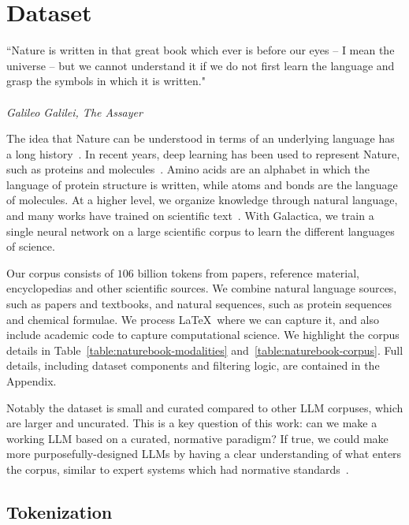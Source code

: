 \section{Dataset}

\begin{displayquote}
“Nature is written in that great book which ever is before our eyes -- I mean the universe -- but we cannot understand it if we do not first learn the language and grasp the symbols in which it is written." \\ \\
\textit{Galileo Galilei, The Assayer}
\end{displayquote}

The idea that Nature can be understood in terms of an underlying language has a long history~\citep{Assayer, Wigner, Wheeler}. In recent years, deep learning has  been used to represent Nature, such as proteins and molecules~\citep{AlphaFold2021, MoLformer}. Amino acids are an alphabet in which the language of protein structure is written, while atoms and bonds are the language of molecules. At a higher level, we organize knowledge through natural language, and many works have trained on scientific text~\citep{SciBERT, BioLM, PubMedBERT, S2ORCBERT}. With Galactica, we train a single neural network on a large scientific corpus to learn the different languages of science.

Our corpus consists of \(106\) billion tokens from papers, reference material, encyclopedias and other scientific sources. We combine natural language sources, such as papers and textbooks, and natural sequences, such as protein sequences and chemical formulae. We process \LaTeX\  where we can capture it, and also include academic code to capture computational science. We highlight the corpus details in Table~\ref{table:naturebook-modalities} and~\ref{table:naturebook-corpus}. Full details, including dataset components and filtering logic, are contained in the Appendix.

Notably the dataset is small and curated compared to other LLM corpuses, which are larger and uncurated. This is a key question of this work: can we make a working LLM based on a curated, normative paradigm? If true, we could make more purposefully-designed LLMs by having a clear understanding of what enters the corpus, similar to expert systems which had normative standards~\citep{Jackson}.

\subsection{Tokenization}

